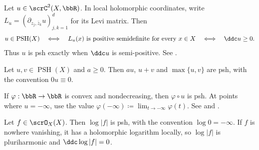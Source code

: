 \begin{example}[label=\labelNFM{eg:c2-function-is-psh-iff-ddc-has-semi-definite-matrix}, status=draft, tag=0000000]
	Let $u \in \scrC^2(X,\bbR)$.
	In local holomorphic coordinates, write $L_u = (\partial_{z_j,\bar z_k}u)_{j,k = 1}^d$ for its Levi matrix.
	Then
	\[ u \in \operatorname{PSH}(X) \quad\Longleftrightarrow\quad L_u(x) \text{ is positive semidefinite for every }x \in X \quad\Longleftrightarrow\quad \ddc u \geq 0. \]
	Thus $u$ is psh exactly when $\ddc u$ is semi-positive.
	See \cite[Chapter~I, \S 5.A, the discussion preceding Theorem~5.8]{Demailly-2012-ComplexAnalyticDifferential}.
\end{example}

\begin{example}[label=\labelNFM{eg:sum-max-convex-composition-of-psh-is-psh}, status=draft, tag=0000000]
	Let $u,v \in \operatorname{PSH}(X)$ and $a \geq 0$.
	Then $au$, $u+v$ and $\max\{u,v\}$ are psh, with the convention $0u \equiv 0$.

	If $\varphi : \bbR \to \bbR$ is convex and nondecreasing, then $\varphi\circ u$ is psh.
	At points where $u = -\infty$, use the value $\varphi(-\infty) \coloneqq \lim_{t \to -\infty}\varphi(t)$.
	See \cite[Proposition 6.2.5]{Dinh-Sibony-2005-IntroductionTheoryCurrents} and
  \cite[Chapter~I, \S 5.A, Theorem~5.6]{Demailly-2012-ComplexAnalyticDifferential}.
\end{example}

\begin{example}[label=\labelNFM{eg:log-holomorphic-is-psh}, status=draft, tag=0000000]
  Let $f \in \scrO_X(X)$.
  Then $\log|f|$ is psh, with the convention $\log 0 = -\infty$.
  If $f$ is nowhere vanishing, it has a holomorphic logarithm locally,
  so $\log|f|$ is pluriharmonic and $\ddc\log|f| = 0$.
\end{example}


